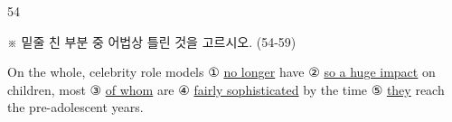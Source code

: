 \begin{question}{54}
\begin{framedtext}
※ 밑줄 친 부분 중 어법상 틀린 것을 고르시오. (54-59) \par
\end{framedtext}
On the whole, celebrity role models ① \uline{no longer} have ② \uline{so a huge impact} on children, most ③ \uline{of whom} are ④ \uline{fairly sophisticated} by the time ⑤ \uline{they} reach the pre-adolescent years.
\end{question}
